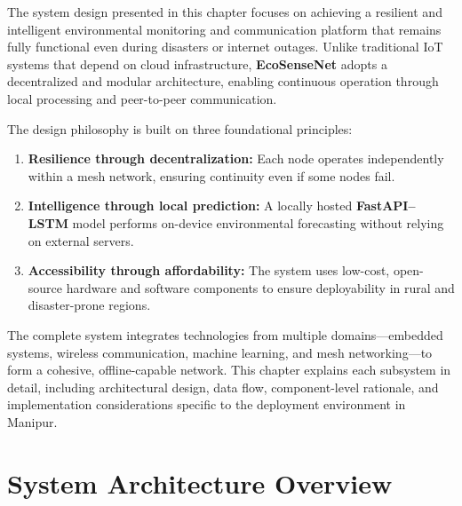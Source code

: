
The system design presented in this chapter focuses on achieving a resilient and intelligent environmental monitoring and communication platform that remains fully functional even during disasters or internet outages. Unlike traditional IoT systems that depend on cloud infrastructure, \textbf{EcoSenseNet} adopts a decentralized and modular architecture, enabling continuous operation through local processing and peer-to-peer communication.

The design philosophy is built on three foundational principles:
\begin{enumerate}
    \item \textbf{Resilience through decentralization:} Each node operates independently within a mesh network, ensuring continuity even if some nodes fail.
    \item \textbf{Intelligence through local prediction:} A locally hosted \textbf{FastAPI–LSTM} model performs on-device environmental forecasting without relying on external servers.
    \item \textbf{Accessibility through affordability:} The system uses low-cost, open-source hardware and software components to ensure deployability in rural and disaster-prone regions.
\end{enumerate}

The complete system integrates technologies from multiple domains—embedded systems, wireless communication, machine learning, and mesh networking—to form a cohesive, offline-capable network. This chapter explains each subsystem in detail, including architectural design, data flow, component-level rationale, and implementation considerations specific to the deployment environment in Manipur.

\section{System Architecture Overview}

